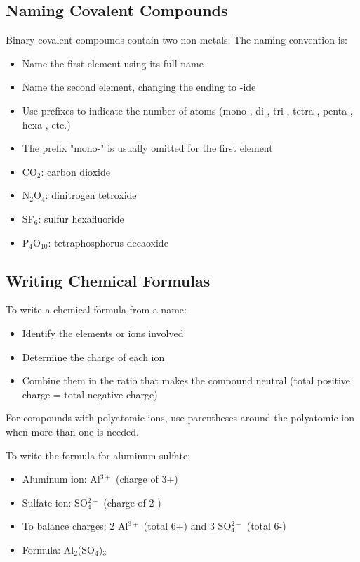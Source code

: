 \subsection{Naming Covalent Compounds}

Binary covalent compounds contain two non-metals. The naming convention is:
\begin{itemize}
    \item Name the first element using its full name
    \item Name the second element, changing the ending to -ide
    \item Use prefixes to indicate the number of atoms (mono-, di-, tri-, tetra-, penta-, hexa-, etc.)
    \item The prefix "mono-" is usually omitted for the first element
\end{itemize}

\begin{example}
\begin{itemize}
    \item CO$_2$: carbon dioxide
    \item N$_2$O$_4$: dinitrogen tetroxide
    \item SF$_6$: sulfur hexafluoride
    \item P$_4$O$_{10}$: tetraphosphorus decaoxide
\end{itemize}
\end{example}

\subsection{Writing Chemical Formulas}

To write a chemical formula from a name:
\begin{itemize}
    \item Identify the elements or ions involved
    \item Determine the charge of each ion
    \item Combine them in the ratio that makes the compound neutral (total positive charge = total negative charge)
\end{itemize}

For compounds with polyatomic ions, use parentheses around the polyatomic ion when more than one is needed.

\begin{example}
To write the formula for aluminum sulfate:
\begin{itemize}
    \item Aluminum ion: Al$^{3+}$ (charge of 3+)
    \item Sulfate ion: SO$_4^{2-}$ (charge of 2-)
    \item To balance charges: 2 Al$^{3+}$ (total 6+) and 3 SO$_4^{2-}$ (total 6-)
    \item Formula: Al$_2$(SO$_4$)$_3$
\end{itemize}
\end{example}

